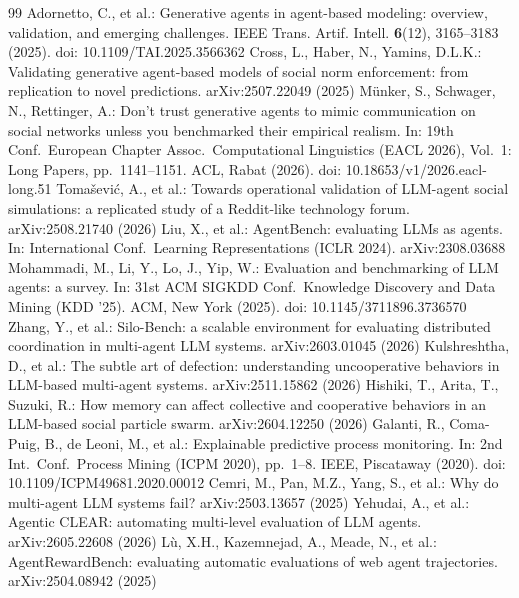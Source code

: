 \documentclass[runningheads]{llncs}
\begin{document}
\begin{thebibliography}{99}
Adornetto, C., et al.: Generative agents in agent-based modeling: overview, validation, and emerging challenges. IEEE Trans. Artif. Intell. \textbf{6}(12), 3165--3183 (2025). doi: 10.1109/TAI.2025.3566362
Cross, L., Haber, N., Yamins, D.L.K.: Validating generative agent-based models of social norm enforcement: from replication to novel predictions. arXiv:2507.22049 (2025)
M{\"u}nker, S., Schwager, N., Rettinger, A.: Don't trust generative agents to mimic communication on social networks unless you benchmarked their empirical realism. In: 19th Conf.\ European Chapter Assoc.\ Computational Linguistics (EACL 2026), Vol.\ 1: Long Papers, pp.\ 1141--1151. ACL, Rabat (2026). doi: 10.18653/v1/2026.eacl-long.51
Toma\v{s}evi\'c, A., et al.: Towards operational validation of LLM-agent social simulations: a replicated study of a Reddit-like technology forum. arXiv:2508.21740 (2026)
Liu, X., et al.: AgentBench: evaluating LLMs as agents. In: International Conf.\ Learning Representations (ICLR 2024). arXiv:2308.03688
Mohammadi, M., Li, Y., Lo, J., Yip, W.: Evaluation and benchmarking of LLM agents: a survey. In: 31st ACM SIGKDD Conf.\ Knowledge Discovery and Data Mining (KDD '25). ACM, New York (2025). doi: 10.1145/3711896.3736570
Zhang, Y., et al.: Silo-Bench: a scalable environment for evaluating distributed coordination in multi-agent LLM systems. arXiv:2603.01045 (2026)
Kulshreshtha, D., et al.: The subtle art of defection: understanding uncooperative behaviors in LLM-based multi-agent systems. arXiv:2511.15862 (2026)
Hishiki, T., Arita, T., Suzuki, R.: How memory can affect collective and cooperative behaviors in an LLM-based social particle swarm. arXiv:2604.12250 (2026)
Galanti, R., Coma-Puig, B., de Leoni, M., et al.: Explainable predictive process monitoring. In: 2nd Int.\ Conf.\ Process Mining (ICPM 2020), pp.\ 1--8. IEEE, Piscataway (2020). doi: 10.1109/ICPM49681.2020.00012
Cemri, M., Pan, M.Z., Yang, S., et al.: Why do multi-agent LLM systems fail? arXiv:2503.13657 (2025)
Yehudai, A., et al.: Agentic CLEAR: automating multi-level evaluation of LLM agents. arXiv:2605.22608 (2026)
L\`u, X.H., Kazemnejad, A., Meade, N., et al.: AgentRewardBench: evaluating automatic evaluations of web agent trajectories. arXiv:2504.08942 (2025)
\end{thebibliography}
\end{document}
